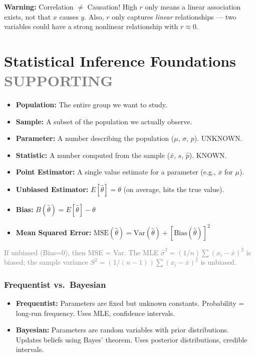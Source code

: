 \documentclass[11pt, letterpaper]{article}
\newcommand{\warn}[1]{\begin{warningbox}\textbf{Warning:} #1\end{warningbox}}
\begin{document}
\warn{Correlation $\neq$ Causation! High $r$ only means a linear association exists, not that $x$ causes $y$. Also, $r$ only captures \emph{linear} relationships --- two variables could have a strong nonlinear relationship with $r \approx 0$.}

\newpage
\hypertarget{sec:stat}{}
\section{Statistical Inference Foundations \hfill \textcolor{gray}{\small SUPPORTING}}

\begin{itemize}[nosep]
  \item \textbf{Population:} The entire group we want to study.
  \item \textbf{Sample:} A subset of the population we actually observe.
  \item \textbf{Parameter:} A number describing the population ($\mu$, $\sigma$, $p$). UNKNOWN.
  \item \textbf{Statistic:} A number computed from the sample ($\bar{x}$, $s$, $\hat{p}$). KNOWN.
  \item \textbf{Point Estimator:} A single value estimate for a parameter (e.g., $\bar{x}$ for $\mu$).
  \item \textbf{Unbiased Estimator:} $E[\hat{\theta}] = \theta$ (on average, hits the true value).
  \item \textbf{Bias:} $B(\hat{\theta}) = E[\hat{\theta}] - \theta$
  \item \textbf{Mean Squared Error:} $\text{MSE}(\hat{\theta}) = \text{Var}(\hat{\theta}) + [\text{Bias}(\hat{\theta})]^2$
\end{itemize}

{\small\textcolor{gray}{If unbiased (Bias=0), then MSE = Var. The MLE $\hat{\sigma}^2 = (1/n)\sum(x_i - \bar{x})^2$ is biased; the sample variance $S^2 = (1/(n{-}1))\sum(x_i - \bar{x})^2$ is unbiased.}}

\subsubsection{Frequentist vs.\ Bayesian}
\begin{itemize}[nosep]
  \item \textbf{Frequentist:} Parameters are fixed but unknown constants. Probability = long-run frequency. Uses MLE, confidence intervals.
  \item \textbf{Bayesian:} Parameters are random variables with prior distributions. Updates beliefs using Bayes' theorem. Uses posterior distributions, credible intervals.
\end{itemize}
\end{document}
